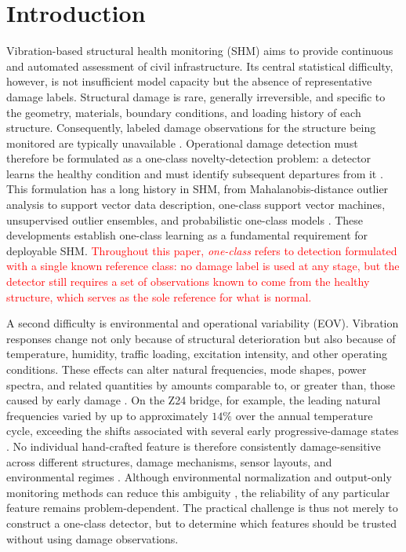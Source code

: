 \documentclass[11pt,a4paper]{article}
\begin{document}
\section{Introduction}
\label{sec:intro}
Vibration-based structural health monitoring (SHM) aims to provide continuous
and automated assessment of civil infrastructure. Its central statistical
difficulty, however, is not insufficient model capacity but the absence of
representative damage labels. Structural damage is rare, generally irreversible,
and specific to the geometry, materials, boundary conditions, and loading
history of each structure. Consequently, labeled damage observations for the
structure being monitored are typically unavailable \cite{farrar2007,farrar2012}.
Operational damage detection must therefore be formulated as a one-class
novelty-detection problem: a detector learns the healthy condition and must
identify subsequent departures from it \cite{worden2000}. This formulation has a
long history in SHM, from Mahalanobis-distance outlier analysis \cite{worden2000}
to support vector data description, one-class support vector machines,
unsupervised outlier ensembles, and probabilistic one-class models
\cite{tax2004,scholkopf1999,bull2019,wang2022}. These developments establish
one-class learning as a fundamental requirement for deployable SHM.
\textcolor{red}{Throughout this paper, \emph{one-class} refers to detection
formulated with a single known reference class: no damage label is used at
any stage, but the detector still requires a set of observations known to
come from the healthy structure, which serves as the sole reference for
what is normal.}

A second difficulty is environmental and operational variability (EOV).
Vibration responses change not only because of structural deterioration but also
because of temperature, humidity, traffic loading, excitation intensity, and
other operating conditions. These effects can alter natural frequencies, mode
shapes, power spectra, and related quantities by amounts comparable to, or
greater than, those caused by early damage \cite{farrar2007,farrar2012}. On the
Z24 bridge, for example, the leading natural frequencies varied by up to
approximately $14\%$ over the annual temperature cycle, exceeding the shifts
associated with several early progressive-damage states \cite{peeters2001}. No
individual hand-crafted feature is therefore consistently damage-sensitive across
different structures, damage mechanisms, sensor layouts, and environmental
regimes \cite{malekloo2022,buckley2023}. Although environmental normalization and
output-only monitoring methods can reduce this ambiguity
\cite{sohn2007,deraemaeker2008}, the reliability of any particular feature
remains problem-dependent. The practical challenge is thus not merely to
construct a one-class detector, but to determine which features should be trusted
without using damage observations.
\end{document}

